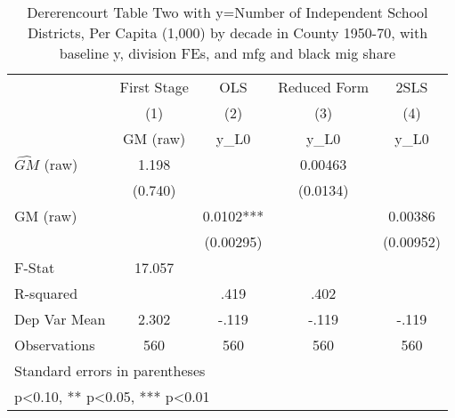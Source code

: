 \begin{table}[htbp]\centering
\def\sym#1{\ifmmode^{#1}\else\(^{#1}\)\fi}
\caption{Dererencourt Table Two with y=Number of Independent School Districts, Per Capita (1,000) by decade in County 1950-70, with baseline y, division FEs, and mfg and black mig share}
\begin{tabular}{l*{4}{c}}
\toprule
                    & First Stage   &         OLS   &Reduced Form   &        2SLS   \\
                    &\multicolumn{1}{c}{(1)}&\multicolumn{1}{c}{(2)}&\multicolumn{1}{c}{(3)}&\multicolumn{1}{c}{(4)}\\
                    &\multicolumn{1}{c}{GM  (raw)}&\multicolumn{1}{c}{y\_L0}&\multicolumn{1}{c}{y\_L0}&\multicolumn{1}{c}{y\_L0}\\
\midrule
$\hat{GM}$ (raw)    &       1.198   &               &     0.00463   &               \\
                    &     (0.740)   &               &    (0.0134)   &               \\
\addlinespace
GM  (raw)           &               &      0.0102***&               &     0.00386   \\
                    &               &   (0.00295)   &               &   (0.00952)   \\
\midrule
F-Stat              &      17.057   &               &               &               \\
R-squared           &               &        .419   &        .402   &               \\
Dep Var Mean        &       2.302   &       -.119   &       -.119   &       -.119   \\
Observations        &         560   &         560   &         560   &         560   \\
\bottomrule
\multicolumn{5}{l}{\footnotesize Standard errors in parentheses}\\
\multicolumn{5}{l}{\footnotesize * p<0.10, ** p<0.05, *** p<0.01}\\
\end{tabular}
\end{table}
